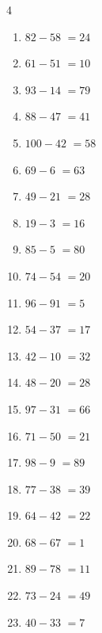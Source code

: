 \begin{multicols}{4}
\begin{enumerate}
  \item $82-58$
        $=24$

  \item $61-51$
        $=10$

\columnbreak %

\resetques

  \item $93-14$
        $=79$

  \item $88-47$
        $=41$

  \item $100-42$
        $=58$

  \item $69-6$
        $=63$

  \item $49-21$
        $=28$

  \item $19-3$
        $=16$

  \item $85-5$
        $=80$

  \item $74-54$
        $=20$

  \item $96-91$
        $=5$

  \item $54-37$
        $=17$

  \item $42-10$
        $=32$

  \item $48-20$
        $=28$

  \item $97-31$
        $=66$

  \item $71-50$
        $=21$

  \item $98-9$
        $=89$

  \item $77-38$
        $=39$

  \item $64-42$
        $=22$

  \item $68-67$
        $=1$

  \item $89-78$
        $=11$

  \item $73-24$
        $=49$

  \item $40-33$
        $=7$


\end{enumerate}
\end{multicols}
